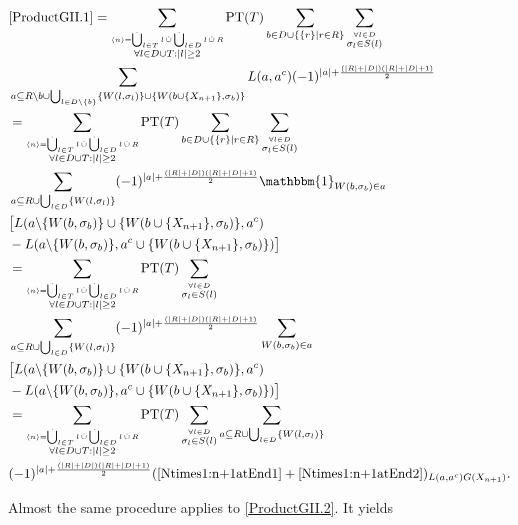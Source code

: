 \documentclass[b5paper,draft,openbib,12pt]{memoir}
\newcommand{\id}{\mathbbm{1}}
\DeclareMathOperator{\dotCup}{\mathop{\dot{\bigcup}}}
\DeclareMathOperator{\dotcup}{\mathop{\dot{\cup}}}
\begin{document}
\begin{align}\notag
&\eqref{ProductGII.1}=\sum_{\stackrel{\langle n \rangle = \dotCup_{l\in T}l \dotcup \dotCup_{l\in D}l \dotcup R}{\forall l \in D\cup T: |l|\ge 2}} \text{PT}(T) \sum_{b\in D \cup \{\{r\}\mid r \in R\}} \sum_{\stackrel{\forall l \in D}{\sigma_l \in S(l)}}\\\notag
 &\sum_{a \subseteq R\backslash b \cup \bigcup_{l \in D\backslash \{b\}}\{W(l,\sigma_l)\} \cup \{W(b\cup \{X_{n+1}\},\sigma_b)\}} L(a,a^c) (-1)^{|a|+ \frac{(|R|+|D|)(|R|+|D|+1)}{2}}\\\notag
 &=\sum_{\stackrel{\langle n \rangle = \dotCup_{l\in T}l \dotcup \dotCup_{l\in D}l \dotcup R}{\forall l \in D\cup T: |l|\ge 2}} \text{PT}(T) \sum_{b\in D \cup \{\{r\}\mid r \in R\}} \sum_{\stackrel{\forall l \in D}{\sigma_l \in S(l)}} \\\notag
 &\sum_{a \subseteq R \cup \bigcup_{l \in D}\{W(l,\sigma_l)\}} (-1)^{|a|+ \frac{(|R|+|D|)(|R|+|D|+1)}{2}}\id_{W(b,\sigma_b)\in a} \\\notag
& \big[L(a\backslash \{W(b,\sigma_b)\} \cup \{W(b\cup \{X_{n+1}\},\sigma_b)\},a^c) \\\notag
& -L(a\backslash \{W(b,\sigma_b)\},a^c \cup \{W(b\cup \{X_{n+1}\},\sigma_b)\}) \big]\\\notag
&=\sum_{\stackrel{\langle n \rangle = \dotCup_{l\in T}l \dotcup \dotCup_{l\in D}l \dotcup R}{\forall l \in D\cup T: |l|\ge 2}} \text{PT}(T)  \sum_{\stackrel{\forall l \in D}{\sigma_l \in S(l)}} \\\notag
 &\sum_{a \subseteq R \cup \bigcup_{l \in D}\{W(l,\sigma_l)\}} (-1)^{|a|+ \frac{(|R|+|D|)(|R|+|D|+1)}{2}}
 \sum_{W(b,\sigma_b) \in a }  \\\notag
& \big[L(a\backslash \{W(b,\sigma_b)\} \cup \{W(b\cup \{X_{n+1}\},\sigma_b)\},a^c) \\\notag
& -L(a\backslash \{W(b,\sigma_b)\},a^c \cup \{W(b\cup \{X_{n+1}\},\sigma_b)\}) \big]\\\notag
&=\sum_{\stackrel{\langle n \rangle = \dotCup_{l\in T}l \dotcup \dotCup_{l\in D}l \dotcup R}{\forall l \in D\cup T: |l|\ge 2}} \text{PT}(T)  \sum_{\stackrel{\forall l \in D}{\sigma_l \in S(l)}} \sum_{a \subseteq R \cup \bigcup_{l \in D}\{W(l,\sigma_l)\}} \\
 & (-1)^{|a|+ \frac{(|R|+|D|)(|R|+|D|+1)}{2}}
 (\eqref{Ntimes1:n+1atEnd1}+\eqref{Ntimes1:n+1atEnd2})_{L(a,a^c)G(X_{n+1})}.
\end{align}

Almost the same procedure applies to \eqref{ProductGII.2}. It yields %
\end{document}
